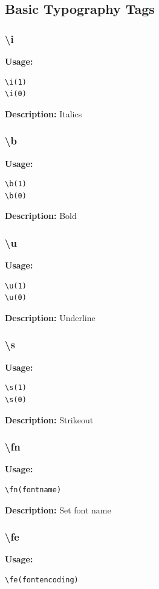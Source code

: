 \documentclass{spec}
\begin{document}
\subsection{Basic Typography Tags}

\subsubsection{\textbackslash i}
\textbf{Usage:}
\begin{verbatim}
\i(1)
\i(0)
\end{verbatim}

\textbf{Description:}
Italics

\subsubsection{\textbackslash b}
\textbf{Usage:}
\begin{verbatim}
\b(1)
\b(0)
\end{verbatim}

\textbf{Description:}
Bold

\subsubsection{\textbackslash u}
\textbf{Usage:}
\begin{verbatim}
\u(1)
\u(0)
\end{verbatim}

\textbf{Description:}
Underline

\subsubsection{\textbackslash s}
\textbf{Usage:}
\begin{verbatim}
\s(1)
\s(0)
\end{verbatim}

\textbf{Description:}
Strikeout

\subsubsection{\textbackslash fn}
\textbf{Usage:}
\begin{verbatim}
\fn(fontname)
\end{verbatim}

\textbf{Description:}
Set font name

\subsubsection{\textbackslash fe}
\textbf{Usage:}
\begin{verbatim}
\fe(fontencoding)
\end{verbatim}
\end{document}
